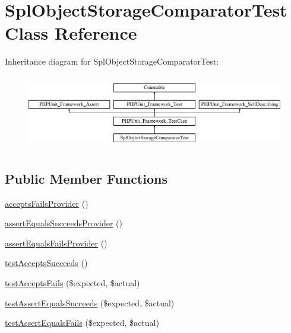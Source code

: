 \hypertarget{class_sebastian_bergmann_1_1_comparator_1_1_spl_object_storage_comparator_test}{}\section{Spl\+Object\+Storage\+Comparator\+Test Class Reference}
\label{class_sebastian_bergmann_1_1_comparator_1_1_spl_object_storage_comparator_test}
Inheritance diagram for Spl\+Object\+Storage\+Comparator\+Test\+:\begin{figure}[H]
\begin{center}
\leavevmode
\includegraphics[height=3.303835cm]{class_sebastian_bergmann_1_1_comparator_1_1_spl_object_storage_comparator_test}
\end{center}
\end{figure}
\subsection*{Public Member Functions}
\begin{DoxyCompactItemize}
\item 
\mbox{\hyperlink{class_sebastian_bergmann_1_1_comparator_1_1_spl_object_storage_comparator_test_a9ea19e26cacbca06356c2f229079f8a1}{accepts\+Fails\+Provider}} ()
\item 
\mbox{\hyperlink{class_sebastian_bergmann_1_1_comparator_1_1_spl_object_storage_comparator_test_acb6bc1b6e9d32990bdd287f8b590a5fa}{assert\+Equals\+Succeeds\+Provider}} ()
\item 
\mbox{\hyperlink{class_sebastian_bergmann_1_1_comparator_1_1_spl_object_storage_comparator_test_a3cc10e39239b6e3f3fda1d34c0fb1c14}{assert\+Equals\+Fails\+Provider}} ()
\item 
\mbox{\hyperlink{class_sebastian_bergmann_1_1_comparator_1_1_spl_object_storage_comparator_test_a585e8e34047f506e60cd80f3c3b5373a}{test\+Accepts\+Succeeds}} ()
\item 
\mbox{\hyperlink{class_sebastian_bergmann_1_1_comparator_1_1_spl_object_storage_comparator_test_afe5eff1a1b7049f973a035117a7e0df1}{test\+Accepts\+Fails}} (\$expected, \$actual)
\item 
\mbox{\hyperlink{class_sebastian_bergmann_1_1_comparator_1_1_spl_object_storage_comparator_test_afb51e0f06ccb75cc8ad5b284a2e0c4cc}{test\+Assert\+Equals\+Succeeds}} (\$expected, \$actual)
\item 
\mbox{\hyperlink{class_sebastian_bergmann_1_1_comparator_1_1_spl_object_storage_comparator_test_a8cd8f77da360a8a9822bf4b9c213de5e}{test\+Assert\+Equals\+Fails}} (\$expected, \$actual)
\end{DoxyCompactItemize}
